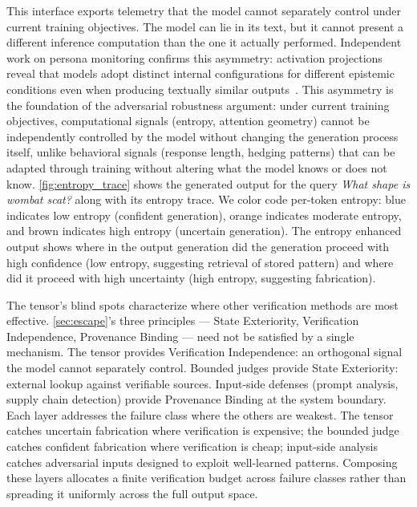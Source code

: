 This interface exports telemetry that the model cannot separately control under current training objectives. The
model can lie in its text, but it cannot present a different inference computation than
the one it actually performed.
Independent work on persona monitoring confirms this asymmetry: activation projections reveal
that models adopt distinct internal configurations for different epistemic conditions even when
producing textually similar outputs~\cite{lu2026assistantaxissituatingstabilizing}. This asymmetry is the foundation of the
adversarial robustness argument: under current training objectives, computational signals (entropy, attention
geometry) cannot be independently controlled by the model without changing the
generation process itself, unlike behavioral signals (response length, hedging
patterns) that can be adapted through training without altering what the model
knows or does not know. 
\autoref{fig:entropy_trace} shows the generated output for the query \textit{What shape is wombat scat?}
along with its entropy trace. We color code per-token entropy: blue indicates low entropy (confident generation), orange indicates moderate entropy, and brown indicates high entropy (uncertain generation).
The entropy enhanced output shows where in the output generation did the generation
proceed with high confidence (low entropy, suggesting retrieval of stored pattern)
and where did it proceed with high uncertainty (high entropy, suggesting fabrication).

 The tensor's blind spots characterize where other verification methods are most effective. \autoref{sec:escape}'s three principles — State Exteriority, Verification Independence, Provenance Binding — need not be satisfied by a single mechanism. The tensor provides Verification Independence: an orthogonal signal the model cannot separately control. Bounded judges provide State Exteriority: external lookup against verifiable sources. Input-side defenses (prompt analysis, supply chain detection) provide Provenance Binding at the system boundary. Each layer addresses the failure class where the others are weakest. The tensor catches uncertain fabrication where verification is expensive; the bounded judge catches confident fabrication where verification is cheap; input-side analysis catches adversarial inputs designed to exploit well-learned patterns. Composing these layers allocates a finite verification budget across failure classes rather than spreading it uniformly across the full output space.

